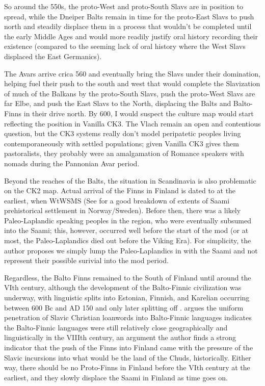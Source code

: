 \documentclass{article}
\begin{document}
	So around the 550s, the proto-West and proto-South Slavs are in position to spread, while the Dneiper Balts remain in time for the proto-East Slavs to push north and steadily displace them in a process that wouldn’t be completed until the early Middle Ages \cite{EmergenceOfRussia} and would more readily justify oral history recording their existence (compared to the seeming lack of oral history where the West Slavs displaced the East Germanics).
	
	The Avars arrive crica 560 and eventually bring the Slavs under their domination, helping fuel their push to the south and west that would complete the Slavization of much of the Balkans by the proto-South Slavs, push the proto-West Slavs are far Elbe, and push the East Slavs to the North, displacing the Balts and Balto-Finns in their drive north.
	By 600, I would suspect the culture map would start reflecting the position in Vanilla CK3.
	The Vlach remain an open and contentious question, but the CK3 systems really don't model peripatetic peoples living contemporaneously with settled populations; given Vanilla CK3 gives them pastoralists, they probably were an amalgamation of Romance speakers with nomads during the Pannonian Avar period.
	
	Beyond the reaches of the Balts, the situation in Scandinavia is also problematic on the CK2 map. Actual arrival of the Finns in Finland is dated to at the earliest, when WtWSMS \cite{LaplandSaami} (See \cite{SaamiMap} for a good breakdown of extents of Saami prehistorical settlement in Norway/Sweden).
	Before then, there was a likely Paleo-Laplandic speaking peoples in the region, who were eventually subsumed into the Saami; this, however, occurred well before the start of the mod (or at most, the Paleo-Laplandics died out before the Viking Era). 
	For simplicity, the author proposes we simply lump the Paleo-Laplandics in with the Saami and not represent their possible surivial into the mod period.
	
	Regardless, the Balto Finns remained to the South of Finland until around the VIth century, although the development of the Balto-Finnic civilization was underway, with linguistic splits into Estonian, Finnish, and Karelian occurring between 600 Bc and AD 150 and only later splitting off \cite{LaplandSaami,DiversificationOfProtoFinnic}.
	\cite{DiversificationOfProtoFinnic} argues the uniform penetration of Slavic Christian loanwords into Balto-Finnic languages indicates the Balto-Finnic languages were still relatively close geographically and linguistically in the VIIIth century, an argument the author finds a strong indicator that the push of the Finns into Finland came with the pressure of the Slavic incursions into what would be the land of the Chuds, historically.
	Either way, there should be no Proto-Finns in Finland before the VIth century at the earliest, and they slowly displace the Saami in Finland as time goes on.
	
\end{document}
